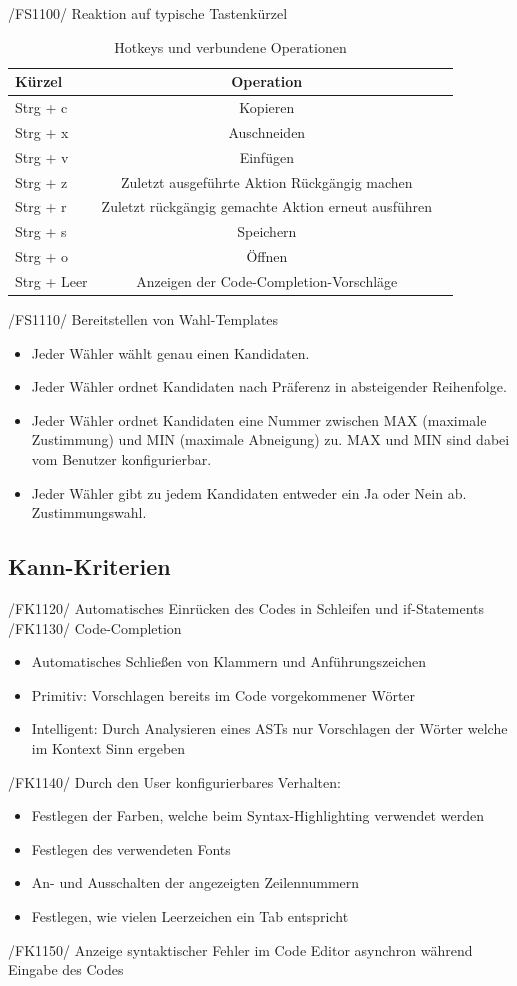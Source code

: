 \documentclass[a4paper]{scrreprt}
\begin{document}
/FS1100/ Reaktion auf typische Tastenkürzel\\
\begin{table}[H]
\caption{Hotkeys und verbundene Operationen}
\begin{tabular}{lcr} 
Kürzel & Operation \\
\hline 
Strg + c & Kopieren \\
Strg + x & Auschneiden \\
Strg + v & Einfügen \\
Strg + z & Zuletzt ausgeführte Aktion Rückgängig machen \\
Strg + r & Zuletzt rückgängig gemachte Aktion erneut ausführen \\
Strg + s & Speichern \\
Strg + o & Öffnen \\
Strg + Leer & Anzeigen der Code-Completion-Vorschläge\\
\end{tabular}
\label{table:Hotkeys_and_operations}
\end{table}
/FS1110/ Bereitstellen von Wahl-Templates
\begin{itemize}
\item Jeder Wähler wählt genau einen Kandidaten.
\item Jeder Wähler ordnet Kandidaten nach Präferenz in absteigender Reihenfolge.
\item Jeder Wähler ordnet Kandidaten eine Nummer zwischen MAX (maximale Zustimmung) und MIN (maximale Abneigung) zu. MAX und MIN sind dabei vom \gls{Benutzer} konfigurierbar. 
\item Jeder Wähler gibt zu jedem Kandidaten entweder ein Ja oder Nein ab. Zustimmungswahl.
\end{itemize}

\subsection{Kann-Kriterien}
/FK1120/ Automatisches Einrücken des Codes in Schleifen und if-Statements \\
/FK1130/ Code-Completion
\begin{itemize}
\item Automatisches Schließen von Klammern und Anführungszeichen
\item Primitiv: Vorschlagen bereits im Code vorgekommener Wörter
\item Intelligent: Durch Analysieren eines ASTs nur Vorschlagen der Wörter welche im Kontext Sinn ergeben
\end{itemize}
/FK1140/ Durch den User konfigurierbares Verhalten:
\begin{itemize}
\item Festlegen der Farben, welche beim Syntax-Highlighting verwendet werden
\item Festlegen des verwendeten Fonts
\item An- und Ausschalten der angezeigten Zeilennummern
\item Festlegen, wie vielen Leerzeichen ein Tab entspricht
\end{itemize}
/FK1150/ Anzeige syntaktischer Fehler im Code Editor asynchron während Eingabe des Codes
 
\end{document}
